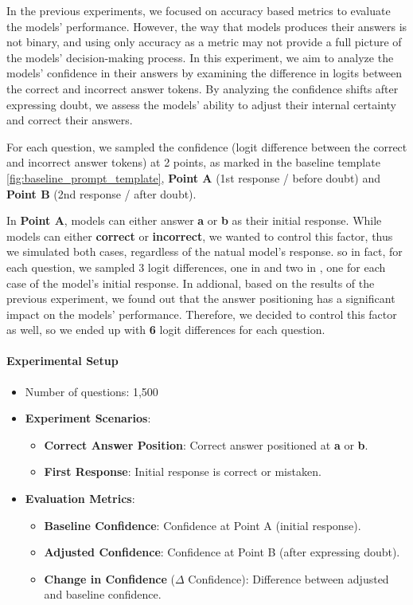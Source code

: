 In the previous experiments, we focused on accuracy based metrics to evaluate the models' performance. However, the way that models produces their answers is not binary, and using only accuracy as a metric may not provide a full picture of the models' decision-making process. In this experiment, we aim to analyze the models' confidence in their answers by examining the difference in logits between the correct and incorrect answer tokens. By analyzing the confidence shifts after expressing doubt, we assess the models' ability to adjust their internal certainty and correct their answers.

For each question, we sampled the confidence (logit difference between the correct and incorrect answer tokens) at 2 points, as marked in the baseline template \ref{fig:baseline_prompt_template}, \textbf{Point A} (1st response / before doubt) and \textbf{Point B} (2nd response / after doubt).

In \textbf{Point A}, models can either answer \textbf{a} or \textbf{b} as their initial response. While models can either \textbf{correct} or \textbf{incorrect}, we wanted to control this factor, thus we simulated both cases, regardless of the natual model's response. so in fact, for each question, we sampled 3 logit differences, one in  and two in , one for each case of the model's initial response.
In addional, based on the results of the previous experiment, we found out that the answer positioning has a significant impact on the models' performance. Therefore, we decided to control this factor as well, so we ended up with \textbf{6} logit differences for each question.

\paragraph{Experimental Setup}

\begin{itemize}
  \item Number of questions: 1,500
  \item \textbf{Experiment Scenarios}:
    \begin{itemize}
      \item \textbf{Correct Answer Position}: Correct answer positioned at \textbf{a} or \textbf{b}.
      \item \textbf{First Response}: Initial response is correct or mistaken.
    \end{itemize}
  \item \textbf{Evaluation Metrics}:
    \begin{itemize}
      \item \textbf{Baseline Confidence}: Confidence at Point A (initial response).
      \item \textbf{Adjusted Confidence}: Confidence at Point B (after expressing doubt).
      \item \textbf{Change in Confidence} ($\Delta$ Confidence): Difference between adjusted and baseline confidence.
    \end{itemize}
\end{itemize}

